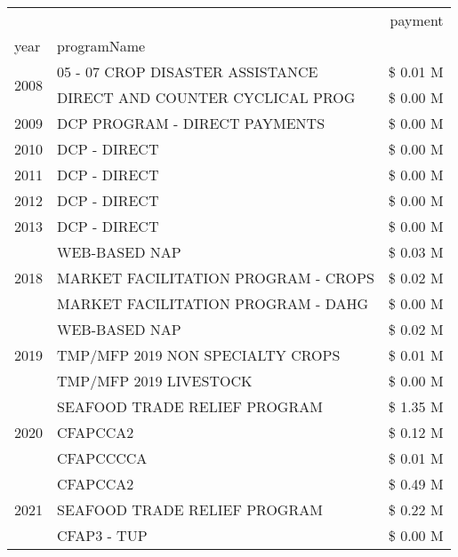 \begin{tabular}{llr}
\toprule
 &  & payment \\
year & programName &  \\
\midrule
\multirow[t]{2}{*}{2008} & 05 - 07 CROP DISASTER ASSISTANCE & \$ 0.01 M \\
 & DIRECT AND COUNTER CYCLICAL PROG & \$ 0.00 M \\
\cline{1-3}
2009 & DCP PROGRAM - DIRECT PAYMENTS & \$ 0.00 M \\
\cline{1-3}
2010 & DCP - DIRECT & \$ 0.00 M \\
\cline{1-3}
2011 & DCP - DIRECT & \$ 0.00 M \\
\cline{1-3}
2012 & DCP - DIRECT & \$ 0.00 M \\
\cline{1-3}
2013 & DCP - DIRECT & \$ 0.00 M \\
\cline{1-3}
\multirow[t]{3}{*}{2018} & WEB-BASED NAP & \$ 0.03 M \\
 & MARKET FACILITATION PROGRAM - CROPS & \$ 0.02 M \\
 & MARKET FACILITATION PROGRAM - DAHG & \$ 0.00 M \\
\cline{1-3}
\multirow[t]{3}{*}{2019} & WEB-BASED NAP & \$ 0.02 M \\
 & TMP/MFP 2019 NON SPECIALTY CROPS & \$ 0.01 M \\
 & TMP/MFP 2019 LIVESTOCK & \$ 0.00 M \\
\cline{1-3}
\multirow[t]{3}{*}{2020} & SEAFOOD TRADE RELIEF PROGRAM & \$ 1.35 M \\
 & CFAPCCA2 & \$ 0.12 M \\
 & CFAPCCCCA & \$ 0.01 M \\
\cline{1-3}
\multirow[t]{3}{*}{2021} & CFAPCCA2 & \$ 0.49 M \\
 & SEAFOOD TRADE RELIEF PROGRAM & \$ 0.22 M \\
 & CFAP3 - TUP & \$ 0.00 M \\
\cline{1-3}
\bottomrule
\end{tabular}
